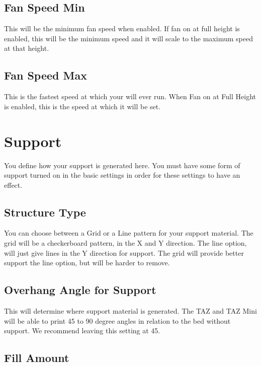\subsection{Fan Speed Min}

This will be the minimum fan speed when enabled. If fan on at full height is enabled, this will be the minimum speed and it will scale to the maximum speed at that height.

\subsection{Fan Speed Max}

This is the fastest speed at which your will ever run. When Fan on at Full Height is enabled, this is the speed at which it will be set.

\section{Support}

You define how your support is generated here. You must have some form of support turned on in the basic settings in order for these settings to have an effect.

\subsection{Structure Type}

You can choose between a Grid or a Line pattern for your support material. The grid will be a checkerboard pattern, in the X and Y direction. The line option, will just give lines in the Y direction for support. The grid will provide better support the line option, but will be harder to remove.

\subsection{Overhang Angle for Support}

This will determine where support material is generated. The TAZ and TAZ Mini will be able to print 45 to 90 degree angles in relation to the bed without support. We recommend leaving this setting at 45.

\subsection{Fill Amount}

